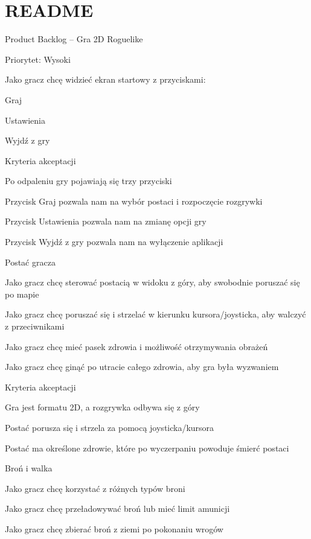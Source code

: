 \chapter{README }
\hypertarget{md__r_e_a_d_m_e}{}\label{md__r_e_a_d_m_e}
Product Backlog – Gra 2D Roguelike

Priorytet:\+ Wysoki

 \begin{DoxyVerb}Jako gracz chcę widzieć ekran startowy z przyciskami: 

Graj 

Ustawienia 

Wyjdź z gry 
\end{DoxyVerb}


Kryteria akceptacji \begin{DoxyVerb}Po odpaleniu gry pojawiają się trzy przyciski 

Przycisk Graj pozwala nam na wybór postaci i rozpoczęcie rozgrywki 

Przycisk Ustawienia pozwala nam na zmianę opcji gry 

Przycisk Wyjdź z gry pozwala nam na wyłączenie aplikacji 
\end{DoxyVerb}


Postać gracza \begin{DoxyVerb}Jako gracz chcę sterować postacią w widoku z góry, aby swobodnie poruszać się po mapie 

Jako gracz chcę poruszać się i strzelać w kierunku kursora/joysticka, aby walczyć z przeciwnikami 

Jako gracz chcę mieć pasek zdrowia i możliwość otrzymywania obrażeń 

Jako gracz chcę ginąć po utracie całego zdrowia, aby gra była wyzwaniem 
\end{DoxyVerb}


Kryteria akceptacji \begin{DoxyVerb}Gra jest formatu 2D, a rozgrywka odbywa się z góry 

Postać porusza się i strzela za pomocą joysticka/kursora 

Postać ma określone zdrowie, które po wyczerpaniu powoduje śmierć postaci 
\end{DoxyVerb}


Broń i walka \begin{DoxyVerb}Jako gracz chcę korzystać z różnych typów broni 

Jako gracz chcę przeładowywać broń lub mieć limit amunicji 

Jako gracz chcę zbierać broń z ziemi po pokonaniu wrogów 
\end{DoxyVerb}


